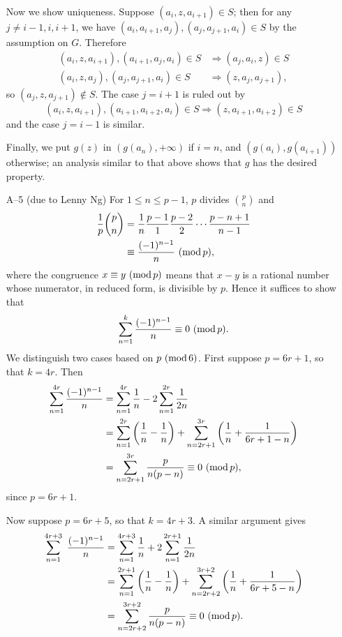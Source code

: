 \documentclass[amssymb,twocolumn,pra,10pt,aps]{revtex4-1}
\def\mymod#1{\,\,({\rm mod}\, #1)}
\begin{document}
\begin{itemize}
Now we show uniqueness. Suppose $(a_{i}, z, a_{i+1}) \in S$; then for
any $j \neq i-1, i, i+1$, we have $(a_{i}, a_{i+1}, a_{j}), (a_{j},
a_{j+1}, a_{i}) \in S$ by the
assumption on $G$. Therefore
\begin{align*}
(a_{i}, z, a_{i+1}), (a_{i+1}, a_{j}, a_{i}) \in S
&\Rightarrow (a_{j}, a_{i}, z) \in S \\
(a_{i}, z, a_{j}), (a_{j}, a_{j+1}, a_{i}) \in S
&\Rightarrow (z, a_{j}, a_{j+1}),
\end{align*}
so $(a_{j}, z, a_{j+1}) \notin S$. The case $j =i+1$ is ruled out by
\[
(a_{i}, z, a_{i+1}), (a_{i+1}, a_{i+2}, a_{i}) \in S \Rightarrow (z,
a_{i+1}, a_{i+2}) \in S
\]
and the case $j=i-1$ is similar.

Finally, we put $g(z)$ in $(g(a_{n}), + \infty)$ if $i = n$, and
$(g(a_{i}), g(a_{i+1}))$ otherwise; an analysis similar to that above
shows that $g$ has the desired property.

\item[A--5] (due to Lenny Ng)
For $1 \leq n \leq p-1$, $p$ divides $\binom pn$ and
\begin{align*}
\frac{1}{p} \binom pn &= \frac{1}{n} \frac{p-1}{1} \frac{p-2}{2} \cdots
\frac{p-n+1}{n-1} \\
&\equiv \frac{(-1)^{n-1}}{n} \mymod{p},
\end{align*}
where the congruence $x \equiv y \mymod{p}$ means that $x-y$ is a
rational number whose numerator, in reduced form, is divisible by $p$.
Hence it suffices to show that
\[
\sum_{n=1}^k \frac{(-1)^{n-1}}{n} \equiv 0 \mymod{p}.
\]
We distinguish two cases based on $p \mymod{6}$. First suppose $p =
6r+1$, so that $k = 4r$. Then
\begin{align*}
\sum_{n=1}^{4r} \frac{(-1)^{n-1}}{n}
&= \sum_{n=1}^{4r} \frac{1}{n} - 2 \sum_{n=1}^{2r} \frac{1}{2n} \\
&= \sum_{n=1}^{2r} \left( \frac{1}{n} - \frac{1}{n} \right)
+ \sum_{n=2r+1}^{3r} \left( \frac{1}{n} + \frac{1}{6r+1-n} \right) \\
&= \sum_{n=2r+1}^{3r} \frac{p}{n(p-n)} \equiv 0 \mymod{p},
\end{align*}
since $p = 6r+1$.

Now suppose $p = 6r+5$, so that $k = 4r + 3$. A similar argument gives
\begin{align*}
\sum_{n=1}^{4r+3}\ \frac{(-1)^{n-1}}{n}
&= \sum_{n=1}^{4r+3} \frac{1}{n} + 2 \sum_{n=1}^{2r+1} \frac{1}{2n} \\
&= \sum_{n=1}^{2r+1} \left( \frac{1}{n} - \frac{1}{n} \right)
+ \sum_{n=2r+2}^{3r+2} \left( \frac{1}{n} + \frac{1}{6r+5-n} \right) \\
&= \sum_{n=2r+2}^{3r+2} \frac{p}{n(p-n)} \equiv 0 \mymod{p}.
\end{align*}


\end{itemize}
\end{document}
